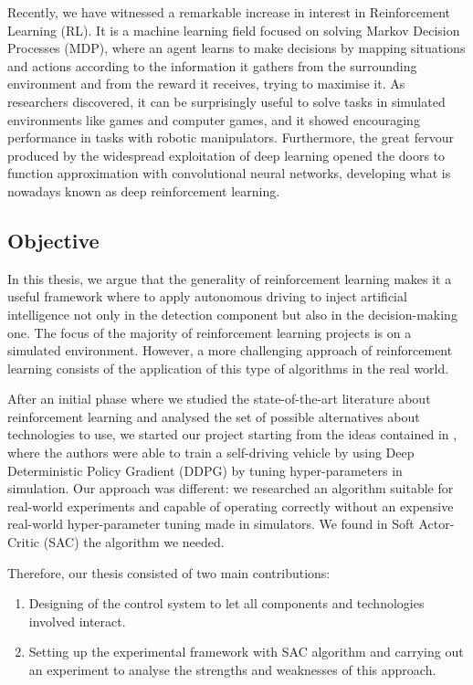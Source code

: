 \documentclass[10pt,twocolumn,letterpaper]{article}
\begin{document}
Recently, we have witnessed a remarkable increase in interest in Reinforcement Learning (RL).
It is a machine learning field focused on solving Markov Decision Processes (MDP), where an agent learns to make decisions by mapping situations and actions according to the information it gathers from the surrounding environment and from the reward it receives, trying to maximise it.
As researchers discovered, it can be surprisingly useful to solve tasks in simulated environments like games and computer games, and it showed encouraging performance in tasks with robotic manipulators.
Furthermore, the great fervour produced by the widespread exploitation of deep learning opened the doors to function approximation with convolutional neural networks, developing what is nowadays known as deep reinforcement learning.

\subsection{Objective}

In this thesis, we argue that the generality of reinforcement learning makes it a useful framework where to apply autonomous driving to inject artificial intelligence not only in the detection component but also in the decision-making one.
The focus of the majority of reinforcement learning projects is on a simulated environment.
However, a more challenging approach of reinforcement learning consists of the application of this type of algorithms in the real world.

After an initial phase where we studied the state-of-the-art literature about reinforcement learning and analysed the set of possible alternatives about technologies to use, we started our project starting from the ideas contained in \cite{kendall2019learning}, where the authors were able to train a self-driving vehicle by using Deep Deterministic Policy Gradient (DDPG) \cite{lillicrap2015continuous} by tuning hyper-parameters in simulation.
Our approach was different: we researched an algorithm suitable for real-world experiments and capable of operating correctly without an expensive real-world hyper-parameter tuning made in simulators.
We found in Soft Actor-Critic (SAC) \cite{haarnoja2018soft} the algorithm we needed.

Therefore, our thesis consisted of two main contributions:
\begin{enumerate}
    \item Designing of the control system to let all components and technologies involved interact.
    \item Setting up the experimental framework with SAC algorithm and carrying out an experiment to analyse the strengths and weaknesses of this approach.
\end{enumerate}
\end{document}
